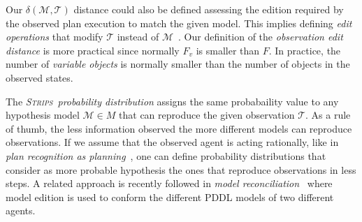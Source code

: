 \documentclass[letterpaper]{article} %
\newcommand{\strips}{\textsc{Strips}}     %
\begin{document}
Our $\delta(\mathcal{M},\mathcal{T})$ distance could also be defined assessing the edition required by the observed plan execution to match the given model. This implies defining {\em edit operations} that modify $\mathcal{T}$ instead of $\mathcal{M}$~\cite{sohrabi:precognition:IJCAI2016}. Our definition of the {\em observation edit distance} is more practical since normally $F_v$ is smaller than $F$. In practice, the number of {\em variable objects} is normally smaller than the number of objects in the observed states.

The {\em \strips\ probability distribution} assigns the same probabaility value to any hypothesis model $\mathcal{M}\in M$ that can reproduce the given observation $\mathcal{T}$. As a rule of thumb, the less information observed the more different models can reproduce observations. If we assume that the observed agent is acting rationally, like in {\em plan recognition as planning}~\cite{ramirez2012plan,ramirez2009plan}, one can define probability distributions that consider as more probable hypothesis the ones that reproduce observations in less steps. A related approach is recently followed in {\em model reconciliation}~\cite{Kambhampati:mreconciliation:ijcai17} where model edition is used to conform the different PDDL models of two different agents. 



\end{document}
